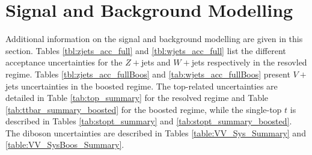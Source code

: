 \section{Signal and Background Modelling}\label{appsec-vh-backsigmod}
Additional information on the signal and background modelling are given in this section. Tables \ref{tbl:zjets_acc_full} and \ref{tbl:wjets_acc_full} list the different acceptance uncertainties for the $Z+$jets and $W+$jets respectively in the resovled regime. Tables \ref{tbl:zjets_acc_fullBoos} and \ref{tab:wjets_acc_fullBoos} present $V+$jets uncertainties in the boosted regime. The top-related uncertainties are detailed in Table \ref{tab:top_summary} for the resolved regime and Table \ref{tab:ttbar_summary_boosted} for the boosted regime, while the single-top $t$ is described in Tables \ref{tab:stopt_summary} and \ref{tab:stopt_summary_boosted}. The diboson uncertainties are described in Tables \ref{table:VV_Sys_Summary} and \ref{table:VV_SysBoos_Summary}.










